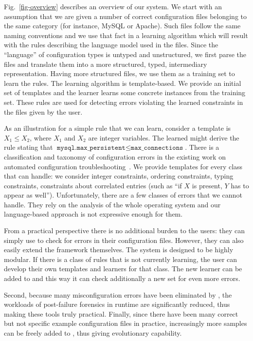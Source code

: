 Fig.~\ref{fig-overview} describes an overview of our system. We start
with an assumption that we are given a number of correct configuration
files belonging to the same category (for instance, MySQL or
Apache). Such files follow the same naming conventions and we use that
fact in a learning algorithm which will result with the rules
describing the language model used in the files. Since the
``language'' of configuration types is untyped and unstructured, we
first parse the files and translate them into a more structured,
typed, intermediary representation. Having more structured files, we
use them as a training set to learn the rules. The learning algorithm
is template-based. We provide an initial set of templates and the
learner learns some concrete instances from the training set. These
rules are used for detecting errors violating the learned constraints
in the files given by the user.

As an 
illustration for a simple rule that we can learn, consider a template is $X_1 \le X_2$, where $X_1$ and $X_2$ are
integer variables. The learned might derive the rule stating that
$\texttt{mysql.max\_persistent} \le \texttt{max\_connections}$. There is a classification and taxonomy of configuration errors in the 
existing work on automated configuration troubleshooting~\cite{yin11anempirical, configdataset}. We provide templates for every class that \app can handle: we consider integer constraints, ordering
constraints, typing constraints, constraints about correlated entries (such as ``if $X$ is present, $Y$ has to appear as well''). Unfortunately, there are a few classes of errors that we cannot handle. They
 rely on the analysis of the whole operating system and our language-based
approach is not expressive enough for them. 

From a  practical perspective there is no additional burden 
to the users: they can simply use \app to check for errors in their configuration files. However, they can also easily extend the framework themselves. The system is designed to be highly modular. If there is a class of rules that \app is not currently learning, the user can develop their own templates and learners for that class. The new learner can be added to \app and this way it can check additionally a new set 
for even more errors.

Second, because many misconfiguration errors have been eliminated 
by \app, the workloads of post-failure forensics in runtime
are significantly reduced, thus making these tools truly practical.
Finally, since there have been many correct but not specific 
example configuration files in practice, 
increasingly more samples can be freely added to \app,
thus giving \app evolutionary capability.

